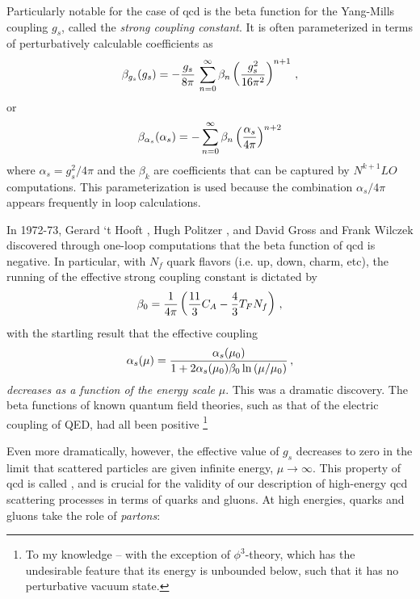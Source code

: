 Particularly notable for the case of \gls{qcd} is the beta function for the Yang-Mills coupling \(g_s\), called the \textit{strong coupling constant}.
%
It is often parameterized in terms of perturbatively calculable coefficients as
\begin{align}
    \beta_{g_s}(g_s)
    =
    -\frac{g_s}{8\pi}\,
    \sum_{n=0}^\infty \beta_n \left(\frac{g_s^2}{16\pi^2}\right)^{n+1}
    \,,
\end{align}
or
\begin{align}
    \beta_{\alpha_s}(\alpha_s)
    =
    -\sum_{n=0}^\infty \beta_n \left(\frac{\alpha_s}{4\pi}\right)^{n+2}
\end{align}
where \(\alpha_s = g_s^2 / 4 \pi\) and the \(\beta_k\) are coefficients that can be captured by \(N^{k+1}LO\) computations.
%
This parameterization is used because the combination \(\alpha_s / 4\pi\) appears frequently in loop calculations.

In 1972-73, Gerard `t Hooft \cite{tHooft:1998qmr}, Hugh Politzer \cite{Politzer:1973fx}, and David Gross and Frank Wilczek \cite{Gross:1973ju} discovered through one-loop computations that the beta function of \gls{qcd} is negative.
%
In particular, with \(N_f\) quark flavors (i.e. up, down, charm, etc), the  running of the effective strong coupling constant is dictated by
\begin{align}
    \beta_0 =
    \frac{1}{4\pi}\left(\frac{11}{3} C_A - \frac{4}{3} T_F N_f\right)
    \,,
\end{align}
with the startling result that the effective coupling
\begin{align}
    \alpha_s(\mu)
    =
    \frac{\alpha_s(\mu_0)}{1 + 2 \alpha_s(\mu_0) \beta_0 \ln\left(\mu / \mu_0\right)}
    \,,
\end{align}
\textit{decreases as a function of the energy scale} \(\mu\).
%
This was a dramatic discovery.
%
The beta functions of known quantum field theories, such as that of the electric coupling of QED, had all been positive%
\footnote{
    To my knowledge -- with the exception of \(\phi^3\)-theory, which has the undesirable feature that its energy is unbounded below, such that it has no perturbative vacuum state.
}

Even more dramatically, however, the effective value of \(g_s\) decreases to zero in the limit that scattered particles are given infinite energy, \(\mu \to \infty\).
%
This property of \gls{qcd} is called , and is crucial for the validity of our description of high-energy \gls{qcd} scattering processes in terms of quarks and gluons.
%
At high energies, quarks and gluons take the role of \textit{partons}:


